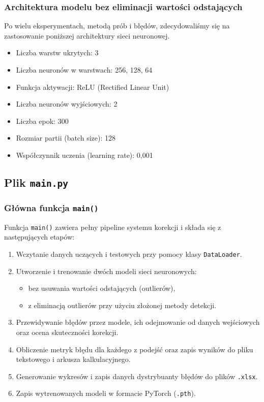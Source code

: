 \documentclass{classrep}
\begin{document}
\subsubsection*{Architektura modelu bez eliminacji wartości odstających}

Po wielu eksperymentach, metodą prób i błędów, zdecydowaliśmy się na zastosowanie poniższej architektury sieci neuronowej.

\begin{itemize}
	\item Liczba warstw ukrytych: 3
	\item Liczba neuronów w warstwach: 256, 128, 64
	\item Funkcja aktywacji: ReLU (Rectified Linear Unit)
	\item Liczba neuronów wyjściowych: 2
	\item Liczba epok: 300
	\item Rozmiar partii (batch size): 128
	\item Współczynnik uczenia (learning rate): 0{,}001
\end{itemize}

\clearpage{}

\subsection{Plik \texttt{main.py}}

\subsubsection*{Główna funkcja \texttt{main()}}

Funkcja \texttt{main()} zawiera pełny pipeline systemu korekcji i składa się z następujących etapów:

\begin{enumerate}
	\item Wczytanie danych uczących i testowych przy pomocy klasy \texttt{DataLoader}.

	\item Utworzenie i trenowanie dwóch modeli sieci neuronowych:
	      \begin{itemize}
		      \item bez usuwania wartości odstających (outlierów),
		      \item z eliminacją outlierów przy użyciu złożonej metody detekcji.
	      \end{itemize}

	\item Przewidywanie błędów przez modele, ich odejmowanie od danych wejściowych oraz ocena skuteczności korekcji.

	\item Obliczenie metryk błędu dla każdego z podejść oraz zapis wyników do pliku tekstowego i arkusza kalkulacyjnego.

	\item Generowanie wykresów i zapis danych dystrybuanty błędów do plików \texttt{.xlsx}.

	\item Zapis wytrenowanych modeli w formacie PyTorch (\texttt{.pth}).
\end{enumerate}
\end{document}
